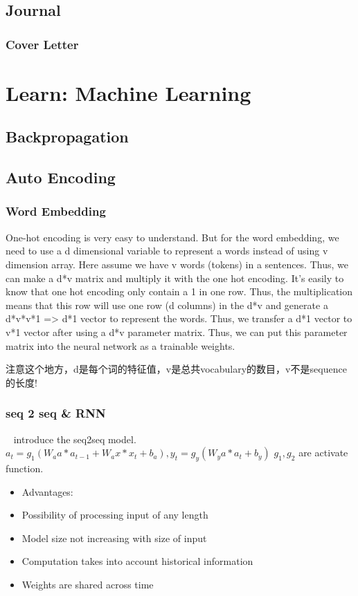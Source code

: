 \documentclass[8pt,UTF8]{article}
\begin{document}
    \subsection{Journal}
        \subsubsection{Cover Letter}
    
\section{Learn: Machine Learning}
    \subsection{Backpropagation}
    
    \subsection{Auto Encoding}
        \subsubsection{Word Embedding}
            One-hot encoding is very easy to understand. But for the word embedding, we need to use a d dimensional variable to represent a words instead of using v dimension array. Here assume we have v words (tokens) in a sentences. Thus, we can make a d*v matrix and multiply it with the one hot encoding. It's easily to know that one hot encoding only contain a 1 in one row. Thus, the multiplication means that this row will use one row (d columns) in the d*v and generate a d*v*v*1 => d*1 vector to represent the words. Thus, we transfer a d*1 vector to v*1 vector after using a d*v parameter matrix. Thus, we can put this parameter matrix into the neural network as a trainable weights.
            
            注意这个地方，d是每个词的特征值，v是总共vocabulary的数目，v不是sequence的长度!
        \subsubsection{seq 2 seq \& RNN}
            ~\cite{sutskever2014sequence} introduce the seq2seq model. 
            $a_t = g_1(W_aa*a_{t-1} + W_ax*x_{t} + b_a), y_t = g_y(W_ya*a_{t} + b_y)$ $g_1,g_2$ are activate function. 
            \begin{itemize}
                \item Advantages:
                \item Possibility of processing input of any length
                \item Model size not increasing with size of input
                \item Computation takes into account historical information
                \item Weights are shared across time
            \end{itemize}
            
\end{document}
